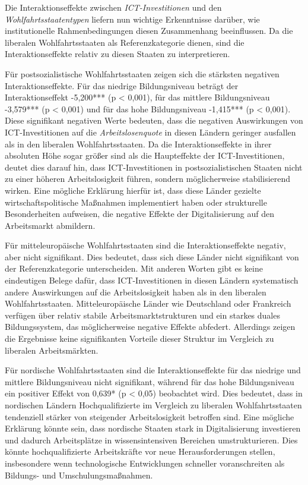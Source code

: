 Die Interaktionseffekte zwischen \textit{\ac{ICT}-Investitionen} und den 
\textit{Wohlfahrtsstaatentypen} liefern nun wichtige Erkenntnisse darüber, wie institutionelle 
Rahmenbedingungen diesen Zusammenhang beeinflussen. Da die liberalen Wohlfahrtsstaaten als 
Referenzkategorie dienen, sind die Interaktionseffekte relativ zu diesen Staaten zu 
interpretieren.

Für postsozialistische Wohlfahrtsstaaten zeigen sich die stärksten negativen Interaktionseffekte. 
Für das niedrige Bildungsniveau beträgt der Interaktionseffekt -5,200*** (p < 0,001), für das 
mittlere Bildungsniveau -3,579*** (p < 0,001) und für das hohe Bildungsniveau -1,415*** 
(p < 0,001). Diese signifikant negativen Werte bedeuten, dass die negativen Auswirkungen von 
\ac{ICT}-Investitionen auf die \textit{Arbeitslosenquote} in diesen Ländern geringer ausfallen 
als in den liberalen Wohlfahrtsstaaten. Da die Interaktionseffekte in ihrer absoluten Höhe sogar 
größer sind als die Haupteffekte der \ac{ICT}-Investitionen, deutet dies darauf hin, dass 
\ac{ICT}-Investitionen in postsozialistischen Staaten nicht zu einer höheren Arbeitslosigkeit 
führen, sondern möglicherweise stabilisierend wirken. Eine mögliche Erklärung hierfür ist, dass 
diese Länder gezielte wirtschaftspolitische Maßnahmen implementiert haben oder strukturelle 
Besonderheiten aufweisen, die negative Effekte der Digitalisierung auf den Arbeitsmarkt abmildern.

Für mitteleuropäische Wohlfahrtsstaaten sind die Interaktionseffekte negativ, aber nicht 
signifikant. Dies bedeutet, dass sich diese Länder nicht signifikant von der Referenzkategorie 
unterscheiden. Mit anderen Worten gibt es keine eindeutigen Belege dafür, dass 
\ac{ICT}-Investitionen in diesen Ländern systematisch andere Auswirkungen auf die 
Arbeitslosigkeit haben als in den liberalen Wohlfahrtsstaaten. Mitteleuropäische Länder wie 
Deutschland oder Frankreich verfügen über relativ stabile Arbeitsmarktstrukturen und ein starkes 
duales Bildungssystem, das möglicherweise negative Effekte abfedert. Allerdings zeigen die 
Ergebnisse keine signifikanten Vorteile dieser Struktur im Vergleich zu liberalen Arbeitsmärkten.

Für nordische Wohlfahrtsstaaten sind die Interaktionseffekte für das niedrige und mittlere 
Bildungsniveau nicht signifikant, während für das hohe Bildungsniveau ein positiver Effekt von 
0,639* (p < 0,05) beobachtet wird. Dies bedeutet, dass in nordischen Ländern Hochqualifizierte 
im Vergleich zu liberalen Wohlfahrtsstaaten tendenziell stärker von steigender Arbeitslosigkeit 
betroffen sind. Eine mögliche Erklärung könnte sein, dass nordische Staaten stark in 
Digitalisierung investieren und dadurch Arbeitsplätze in wissensintensiven Bereichen 
umstrukturieren. Dies könnte hochqualifizierte Arbeitskräfte vor neue Herausforderungen stellen, 
insbesondere wenn technologische Entwicklungen schneller voranschreiten als Bildungs- und 
Umschulungsmaßnahmen.

